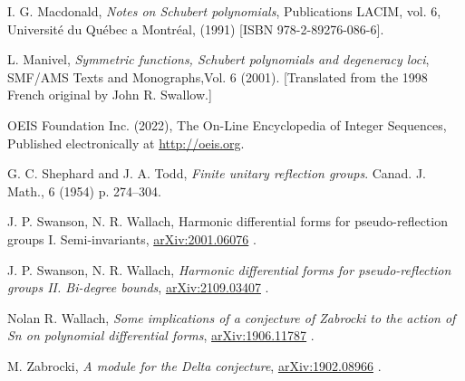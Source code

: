 \documentclass[11pt]{amsart}
\theoremstyle{definition}
\numberwithin{equation}{section}
\begin{document}
\begin{thebibliography}{999}
 I. G. Macdonald,
\textit{Notes on Schubert polynomials}, 
Publications LACIM, vol. 6, Université du Québec a Montréal,  (1991) [ISBN 978-2-89276-086-6].

 L. Manivel,
\textit{Symmetric functions, {S}chubert polynomials and degeneracy loci},
SMF/AMS Texts and Monographs,Vol. {6} (2001).
[Translated from the 1998 French original by John R. Swallow.]

 OEIS Foundation Inc. (2022),
The On-Line Encyclopedia of Integer Sequences, Published electronically at
\href{http://oeis.org}{http://oeis.org}.

 G. C. Shephard and J. A. Todd,
\textit{Finite unitary reflection groups}.
Canad. J. Math., 6 (1954) p. 274--304.

 J. P. Swanson, N. R. Wallach,
Harmonic differential forms for pseudo-reflection groups I. Semi-invariants,
\href{https://arxiv.org/abs/2001.06076}{arXiv:2001.06076} .


 J. P. Swanson, N. R. Wallach,
\textit{Harmonic differential forms for pseudo-reflection groups II. Bi-degree bounds},
\href{https://arxiv.org/abs/2109.03407}{arXiv:2109.03407} .


 Nolan R. Wallach,
\textit{Some implications of a conjecture of Zabrocki
to the action of Sn on polynomial differential forms},
\href{https://arxiv.org/abs/1906.11787}{arXiv:1906.11787} .

 M. Zabrocki,
\textit{A module for the Delta conjecture},
\href{https://arxiv.org/abs/1902.08966}{arXiv:1902.08966} .


\end{thebibliography}
\end{document}
